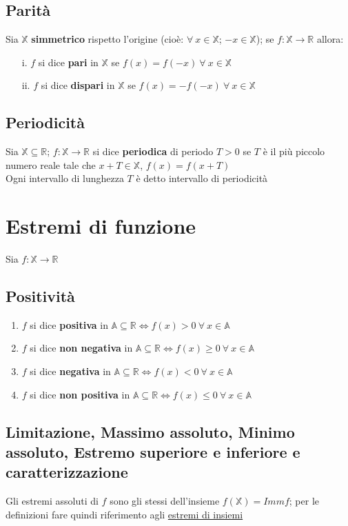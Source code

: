\subsection{Parità}
Sia $\mathbb{X}$ \textbf{simmetrico} rispetto l'origine (cioè: $\forall\ x \in \mathbb{X}$; $-x \in \mathbb{X}$); se $f: \mathbb{X} \rightarrow \mathbb{R}$ allora:
\begin{enumerate}
\item[i.] $f$ si dice \textbf{pari} in $\mathbb{X}$ se $f(x) = f(-x)\ \forall\ x \in \mathbb{X}$
\item[ii.] $f$ si dice \textbf{dispari} in $\mathbb{X}$ se $f(x) = -f(-x)\ \forall\ x \in \mathbb{X}$
\end{enumerate}

\subsection{Periodicità}
Sia $\mathbb{X} \subseteq \mathbb{R}$;   $f: \mathbb{X} \rightarrow \mathbb{R}$ si dice \textbf{periodica} di periodo $T>0$ se $T$ è il più piccolo numero reale tale che $x + T \in \mathbb{X}$, $f(x) = f(x + T)$\\
Ogni intervallo di lunghezza $T$ è detto intervallo di periodicità

\section{Estremi di funzione}
Sia $f: \mathbb{X} \rightarrow \mathbb{R}$
\subsection{Positività}
\begin{enumerate}
\item $f$ si dice \textbf{positiva} in $\mathbb{A} \subseteq \mathbb{R} \iff f(x)>0\ \forall\ x \in \mathbb{A}$
\item $f$ si dice \textbf{non negativa} in $\mathbb{A} \subseteq \mathbb{R} \iff f(x) \geq 0\ \forall\ x \in \mathbb{A}$
\item $f$ si dice \textbf{negativa} in $\mathbb{A} \subseteq \mathbb{R} \iff f(x)<0\ \forall\ x \in \mathbb{A}$
\item $f$ si dice \textbf{non positiva} in $\mathbb{A} \subseteq \mathbb{R} \iff f(x) \leq 0\ \forall\ x \in \mathbb{A}$
\end{enumerate}
\subsection{Limitazione, Massimo assoluto, Minimo assoluto, Estremo superiore e inferiore e caratterizzazione}
Gli estremi assoluti di $f$ sono gli stessi dell'insieme $f(\mathbb{X}) = Immf$; per le definizioni fare quindi riferimento agli \hyperref[sec: estremiInsiemi]{\color{cyan}estremi di insiemi}
